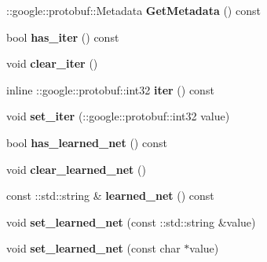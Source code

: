 \begin{DoxyCompactItemize}
\item 
\mbox{\label{classcaffe_1_1_solver_state_abede41fd4f8c870591d93e013645b0e6}} 
\+::google\+::protobuf\+::\+Metadata {\bfseries Get\+Metadata} () const
\item 
\mbox{\label{classcaffe_1_1_solver_state_a3001b35ac6b7dc1eb1c4220caccc58ad}} 
bool {\bfseries has\+\_\+iter} () const
\item 
\mbox{\label{classcaffe_1_1_solver_state_ad5b541b46e7346b9dfffaf8b24c67d4b}} 
void {\bfseries clear\+\_\+iter} ()
\item 
\mbox{\label{classcaffe_1_1_solver_state_a4e863b8ffef8a19c432ea266420416bd}} 
inline \+::google\+::protobuf\+::int32 {\bfseries iter} () const
\item 
\mbox{\label{classcaffe_1_1_solver_state_ad1c46280bcdfa1d1b6cd8757c52089f8}} 
void {\bfseries set\+\_\+iter} (\+::google\+::protobuf\+::int32 value)
\item 
\mbox{\label{classcaffe_1_1_solver_state_a7a2ccc860475044abd9115c71abad5fc}} 
bool {\bfseries has\+\_\+learned\+\_\+net} () const
\item 
\mbox{\label{classcaffe_1_1_solver_state_aa8d4816a5b31ab0128eaccbf78a8cb36}} 
void {\bfseries clear\+\_\+learned\+\_\+net} ()
\item 
\mbox{\label{classcaffe_1_1_solver_state_a60bc329e2973302551a262b2be34b799}} 
const \+::std\+::string \& {\bfseries learned\+\_\+net} () const
\item 
\mbox{\label{classcaffe_1_1_solver_state_aae938f0f63693102f0027ec30fa592e3}} 
void {\bfseries set\+\_\+learned\+\_\+net} (const \+::std\+::string \&value)
\item 
\mbox{\label{classcaffe_1_1_solver_state_aa5c11250c1df93aa4f94107ece085b03}} 
void {\bfseries set\+\_\+learned\+\_\+net} (const char $\ast$value)
\item 

\end{DoxyCompactItemize}
